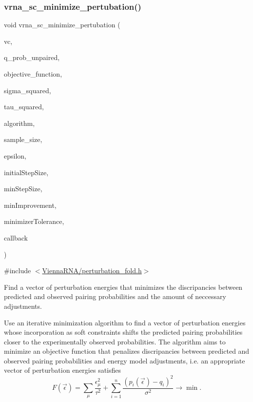 \subsubsection{\texorpdfstring{vrna\+\_\+sc\+\_\+minimize\+\_\+pertubation()}{vrna\_sc\_minimize\_pertubation()}}
{\footnotesize\ttfamily void vrna\+\_\+sc\+\_\+minimize\+\_\+pertubation (\begin{DoxyParamCaption}\item[{\mbox{\hyperlink{group__fold__compound_ga1b0cef17fd40466cef5968eaeeff6166}{vrna\+\_\+fold\+\_\+compound\+\_\+t}} $\ast$}]{vc,  }\item[{const double $\ast$}]{q\+\_\+prob\+\_\+unpaired,  }\item[{int}]{objective\+\_\+function,  }\item[{double}]{sigma\+\_\+squared,  }\item[{double}]{tau\+\_\+squared,  }\item[{int}]{algorithm,  }\item[{int}]{sample\+\_\+size,  }\item[{double $\ast$}]{epsilon,  }\item[{double}]{initial\+Step\+Size,  }\item[{double}]{min\+Step\+Size,  }\item[{double}]{min\+Improvement,  }\item[{double}]{minimizer\+Tolerance,  }\item[{\mbox{\hyperlink{group__perturbation_gaa715397c7afd2d2955c315512a3d571a}{progress\+\_\+callback}}}]{callback }\end{DoxyParamCaption})}



{\ttfamily \#include $<$\mbox{\hyperlink{perturbation__fold_8h}{Vienna\+R\+N\+A/perturbation\+\_\+fold.\+h}}$>$}



Find a vector of perturbation energies that minimizes the discripancies between predicted and observed pairing probabilities and the amount of neccessary adjustments. 

Use an iterative minimization algorithm to find a vector of perturbation energies whose incorporation as soft constraints shifts the predicted pairing probabilities closer to the experimentally observed probabilities. The algorithm aims to minimize an objective function that penalizes discripancies between predicted and observed pairing probabilities and energy model adjustments, i.\+e. an appropriate vector of perturbation energies satisfies \[ F(\vec\epsilon) = \sum_{\mu}{ \frac{\epsilon_{\mu}^2}{\tau^2} } + \sum_{i = 1}^n{ \frac{(p_i(\vec\epsilon) - q_i)^2}{\sigma^2} } \to \min. \]

